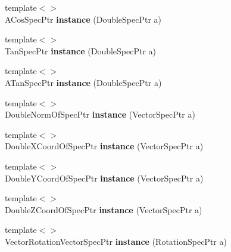 \begin{DoxyCompactItemize}
\item 
\hypertarget{namespacegiskard__suturo_a90365cb4144b945c507060b660162bae}{{\footnotesize template$<$$>$ }\\A\-Cos\-Spec\-Ptr {\bfseries instance} (Double\-Spec\-Ptr a)}\label{namespacegiskard__suturo_a90365cb4144b945c507060b660162bae}

\item 
\hypertarget{namespacegiskard__suturo_afaab4e44c6344f6ec35bc1ec21356425}{{\footnotesize template$<$$>$ }\\Tan\-Spec\-Ptr {\bfseries instance} (Double\-Spec\-Ptr a)}\label{namespacegiskard__suturo_afaab4e44c6344f6ec35bc1ec21356425}

\item 
\hypertarget{namespacegiskard__suturo_a6cb64f369af05bcc810634f853d650aa}{{\footnotesize template$<$$>$ }\\A\-Tan\-Spec\-Ptr {\bfseries instance} (Double\-Spec\-Ptr a)}\label{namespacegiskard__suturo_a6cb64f369af05bcc810634f853d650aa}

\item 
\hypertarget{namespacegiskard__suturo_a0f1fb6cdd09e3c56275e5cebc2c091cd}{{\footnotesize template$<$$>$ }\\Double\-Norm\-Of\-Spec\-Ptr {\bfseries instance} (Vector\-Spec\-Ptr a)}\label{namespacegiskard__suturo_a0f1fb6cdd09e3c56275e5cebc2c091cd}

\item 
\hypertarget{namespacegiskard__suturo_aa981c329e4a8286cc5a9f4c211aed21c}{{\footnotesize template$<$$>$ }\\Double\-X\-Coord\-Of\-Spec\-Ptr {\bfseries instance} (Vector\-Spec\-Ptr a)}\label{namespacegiskard__suturo_aa981c329e4a8286cc5a9f4c211aed21c}

\item 
\hypertarget{namespacegiskard__suturo_a2dd6e3d1972501f0f4468ea39b6c2f8f}{{\footnotesize template$<$$>$ }\\Double\-Y\-Coord\-Of\-Spec\-Ptr {\bfseries instance} (Vector\-Spec\-Ptr a)}\label{namespacegiskard__suturo_a2dd6e3d1972501f0f4468ea39b6c2f8f}

\item 
\hypertarget{namespacegiskard__suturo_a95468d83175393b34c4508cebe5f4036}{{\footnotesize template$<$$>$ }\\Double\-Z\-Coord\-Of\-Spec\-Ptr {\bfseries instance} (Vector\-Spec\-Ptr a)}\label{namespacegiskard__suturo_a95468d83175393b34c4508cebe5f4036}

\item 
\hypertarget{namespacegiskard__suturo_aa687b7ec154d6e1cd7fe3a418b01e33c}{{\footnotesize template$<$$>$ }\\Vector\-Rotation\-Vector\-Spec\-Ptr {\bfseries instance} (Rotation\-Spec\-Ptr a)}\label{namespacegiskard__suturo_aa687b7ec154d6e1cd7fe3a418b01e33c}


\end{DoxyCompactItemize}
